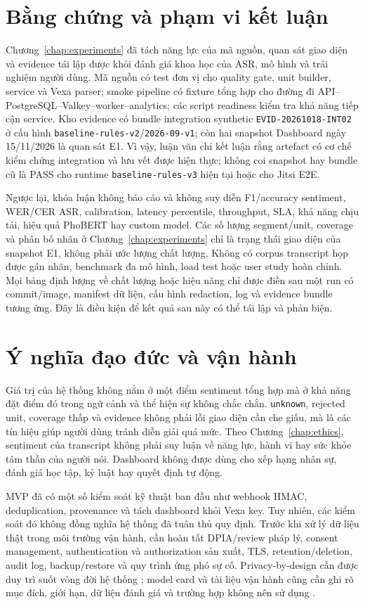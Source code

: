 \section{Bằng chứng và phạm vi kết luận}
Chương~\ref{chap:experiments} đã tách năng lực của mã nguồn, quan sát giao diện và evidence tái lập được khỏi đánh giá khoa học của ASR, mô hình và trải nghiệm người dùng. Mã nguồn có test đơn vị cho quality gate, unit builder, service và Vexa parser; smoke pipeline có fixture tổng hợp cho đường đi API--PostgreSQL--Valkey--worker--analytics; các script readiness kiểm tra khả năng tiếp cận service. Kho evidence có bundle integration synthetic \texttt{EVID-20261018-INT02} ở cấu hình \texttt{baseline-rules-v2}/\texttt{2026-09-v1}; còn hai snapshot Dashboard ngày 15/11/2026 là quan sát E1. Vì vậy, luận văn chỉ kết luận rằng artefact có cơ chế kiểm chứng integration và lưu vết được hiện thực; không coi snapshot hay bundle cũ là PASS cho runtime \texttt{baseline-rules-v3} hiện tại hoặc cho Jitsi E2E.

Ngược lại, khóa luận không báo cáo và không suy diễn F1/accuracy sentiment, WER/CER ASR, calibration, latency percentile, throughput, SLA, khả năng chịu tải, hiệu quả PhoBERT hay custom model. Các số lượng segment/unit, coverage và phân bố nhãn ở Chương~\ref{chap:experiments} chỉ là trạng thái giao diện của snapshot E1, không phải ước lượng chất lượng. Không có corpus transcript họp được gán nhãn, benchmark đa mô hình, load test hoặc user study hoàn chỉnh. Mọi bảng định lượng về chất lượng hoặc hiệu năng chỉ được điền sau một run có commit/image, manifest dữ liệu, cấu hình redaction, log và evidence bundle tương ứng. Đây là điều kiện để kết quả sau này có thể tái lập và phản biện.

\section{Ý nghĩa đạo đức và vận hành}
Giá trị của hệ thống không nằm ở một điểm sentiment tổng hợp mà ở khả năng đặt điểm đó trong ngữ cảnh và thể hiện sự không chắc chắn. \texttt{unknown}, rejected unit, coverage thấp và evidence không phải lỗi giao diện cần che giấu, mà là các tín hiệu giúp người dùng tránh diễn giải quá mức. Theo Chương~\ref{chap:ethics}, sentiment của transcript không phải suy luận về năng lực, hành vi hay sức khỏe tâm thần của người nói. Dashboard không được dùng cho xếp hạng nhân sự, đánh giá học tập, kỷ luật hay quyết định tự động.

MVP đã có một số kiểm soát kỹ thuật ban đầu như webhook HMAC, deduplication, provenance và tách dashboard khỏi Vexa key. Tuy nhiên, các kiểm soát đó không đồng nghĩa hệ thống đã tuân thủ quy định. Trước khi xử lý dữ liệu thật trong môi trường vận hành, cần hoàn tất DPIA/review pháp lý, consent management, authentication và authorization sản xuất, TLS, retention/deletion, audit log, backup/restore và quy trình ứng phó sự cố. Privacy-by-design cần được duy trì suốt vòng đời hệ thống \cite{cavoukian2011}; model card và tài liệu vận hành cũng cần ghi rõ mục đích, giới hạn, dữ liệu đánh giá và trường hợp không nên sử dụng \cite{mitchell2019}.

